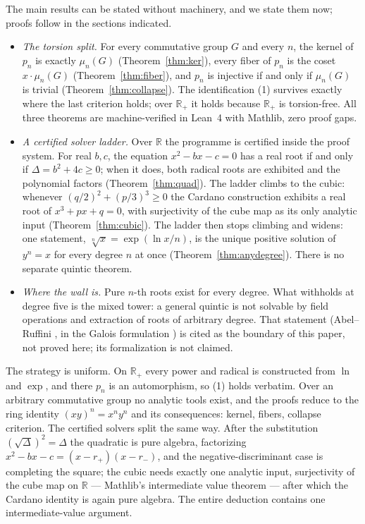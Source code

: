 \documentclass[submission,noinfoline]{jsfds}
\begin{document}
The main results can be stated without machinery, and we state them now;
proofs follow in the sections indicated.

\begin{itemize}
\item \emph{The torsion split.} For every commutative group $G$ and every
$n$, the kernel of $p_n$ is exactly $\mu_n(G)$
(Theorem~\ref{thm:ker}), every fiber of $p_n$ is the coset
$x\cdot\mu_n(G)$ (Theorem~\ref{thm:fiber}), and $p_n$ is injective if
and only if $\mu_n(G)$ is trivial (Theorem~\ref{thm:collapse}). The
identification (1) survives exactly where the last criterion holds;
over $\mathbb R_+$ it holds because $\mathbb R_+$ is torsion-free. All
three theorems are machine-verified in Lean~4 with Mathlib, zero proof
gaps.
\item \emph{A certified solver ladder.} Over $\mathbb R$ the programme
is certified inside the proof system. For real $b,c$, the equation
$x^2-bx-c=0$ has a real root if and only if $\Delta=b^2+4c\ge0$; when
it does, both radical roots are exhibited and the polynomial factors
(Theorem~\ref{thm:quad}). The ladder climbs to the cubic: whenever
$(q/2)^2+(p/3)^3\ge0$ the Cardano construction exhibits a real root of
$x^3+px+q=0$, with surjectivity of the cube map as its only analytic
input (Theorem~\ref{thm:cubic}). The ladder then stops climbing and
widens: one statement, $\sqrt[n]{x}=\exp(\ln x/n)$, is the unique
positive solution of $y^n=x$ for every degree $n$ at once
(Theorem~\ref{thm:anydegree}). There is no separate quintic theorem.
\item \emph{Where the wall is.} Pure $n$-th roots exist for every
degree. What withholds at degree five is the mixed tower: a general
quintic is not solvable by field operations and extraction of roots of
arbitrary degree. That statement (Abel--Ruffini \citep{Abel1824}, in the
Galois formulation \citep{Galois1846}) is cited as the boundary of this
paper, not proved here; its formalization is not claimed.
\end{itemize}

The strategy is uniform. On $\mathbb R_+$ every power and radical is
constructed from $\ln$ and $\exp$, and there $p_n$ is an automorphism,
so (1) holds verbatim. Over an arbitrary commutative group no analytic
tools exist, and the proofs reduce to the ring identity
$(xy)^n=x^ny^n$ and its consequences: kernel, fibers, collapse
criterion. The certified solvers split the same way. After the
substitution $(\sqrt\Delta)^2=\Delta$ the quadratic is pure algebra,
factorizing $x^2-bx-c=(x-r_+)(x-r_-)$, and the negative-discriminant
case is completing the square; the cubic needs exactly one analytic
input, surjectivity of the cube map on $\mathbb R$ --- Mathlib's
intermediate value theorem --- after which the Cardano identity is again
pure algebra. The entire deduction contains one intermediate-value
argument.
\end{document}
